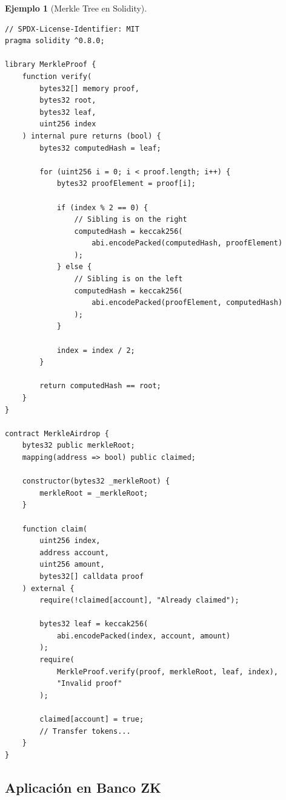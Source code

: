 \documentclass[11pt,a4paper,twoside,openright]{book}
\theoremstyle{definition}
\newtheorem{example}{Ejemplo}[chapter]
\theoremstyle{plain}
\theoremstyle{remark}
\begin{document}
\begin{example}[Merkle Tree en Solidity]
\begin{verbatim}
// SPDX-License-Identifier: MIT
pragma solidity ^0.8.0;

library MerkleProof {
    function verify(
        bytes32[] memory proof,
        bytes32 root,
        bytes32 leaf,
        uint256 index
    ) internal pure returns (bool) {
        bytes32 computedHash = leaf;
        
        for (uint256 i = 0; i < proof.length; i++) {
            bytes32 proofElement = proof[i];
            
            if (index % 2 == 0) {
                // Sibling is on the right
                computedHash = keccak256(
                    abi.encodePacked(computedHash, proofElement)
                );
            } else {
                // Sibling is on the left
                computedHash = keccak256(
                    abi.encodePacked(proofElement, computedHash)
                );
            }
            
            index = index / 2;
        }
        
        return computedHash == root;
    }
}

contract MerkleAirdrop {
    bytes32 public merkleRoot;
    mapping(address => bool) public claimed;
    
    constructor(bytes32 _merkleRoot) {
        merkleRoot = _merkleRoot;
    }
    
    function claim(
        uint256 index,
        address account,
        uint256 amount,
        bytes32[] calldata proof
    ) external {
        require(!claimed[account], "Already claimed");
        
        bytes32 leaf = keccak256(
            abi.encodePacked(index, account, amount)
        );
        require(
            MerkleProof.verify(proof, merkleRoot, leaf, index),
            "Invalid proof"
        );
        
        claimed[account] = true;
        // Transfer tokens...
    }
}
\end{verbatim}
\end{example}

\subsection{Aplicación en Banco ZK}
\end{document}
